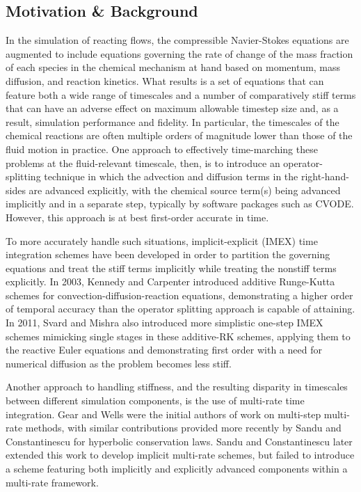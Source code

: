 \subsection{Motivation \& Background}

In the simulation of reacting flows, the compressible Navier-Stokes
equations are augmented to include equations governing the rate of
change of the mass fraction of each species in the chemical mechanism
at hand based on momentum, mass diffusion, and reaction kinetics. What
results is a set of equations that can feature both a wide range of
timescales and a number of comparatively stiff terms that can have
an adverse effect on maximum allowable timestep size and, as a result,
simulation performance and fidelity. In particular, the timescales
of the chemical reactions are often multiple orders of magnitude lower
than those of the fluid motion in practice. One approach to effectively
time-marching these problems at the fluid-relevant timescale, then, is
to introduce an operator-splitting technique in which the advection
and diffusion terms in the right-hand-sides are advanced explicitly,
with the chemical source term(s) being advanced implicitly and
in a separate step, typically by software packages such as CVODE.
However, this approach is at best first-order accurate in time.

To more accurately handle such situations, implicit-explicit (IMEX) time
integration schemes have been developed in order to partition the
governing equations and treat the stiff terms implicitly while treating
the nonstiff terms explicitly. In 2003, Kennedy and Carpenter introduced
additive Runge-Kutta schemes for convection-diffusion-reaction equations,
demonstrating a higher order of temporal accuracy than the operator splitting
approach is capable of attaining. In 2011, Svard and Mishra also introduced
more simplistic one-step IMEX schemes mimicking single stages in these
additive-RK schemes, applying them to the reactive Euler equations and
demonstrating first order with a need for numerical diffusion as the problem
becomes less stiff.

Another approach to handling stiffness, and the resulting disparity in
timescales between different simulation components, is the use of multi-rate
time integration. Gear and Wells were the initial authors of work on
multi-step multi-rate methods, with similar contributions provided more
recently by Sandu and Constantinescu for hyperbolic conservation laws. Sandu
and Constantinescu later extended this work to develop implicit multi-rate
schemes, but failed to introduce a scheme featuring both implicitly and
explicitly advanced components within a multi-rate framework.

